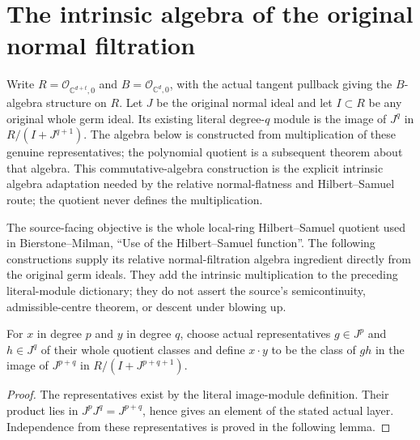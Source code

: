 \section{The intrinsic algebra of the original normal filtration}

Write $R=\mathcal O_{\mathbb C^{d+t},0}$ and
$B=\mathcal O_{\mathbb C^d,0}$, with the actual tangent pullback giving
the $B$-algebra structure on $R$. Let $J$ be the original normal ideal and
let $I\subset R$ be any original whole germ ideal. Its existing literal
degree-$q$ module is the image of $J^q$ in $R/(I+J^{q+1})$. The algebra
below is constructed from multiplication of these genuine representatives;
the polynomial quotient is a subsequent theorem about that algebra. This
commutative-algebra construction is the explicit intrinsic algebra adaptation
needed by the relative normal-flatness and Hilbert--Samuel route; the quotient
never defines the multiplication.

The source-facing objective is the whole local-ring Hilbert--Samuel
quotient used in Bierstone--Milman, ``Use of the Hilbert--Samuel function''.
The following constructions supply its relative normal-filtration algebra
ingredient directly from the original germ ideals. They add the intrinsic
multiplication to the preceding literal-module dictionary; they do not assert
the source's semicontinuity, admissible-centre theorem, or descent under
blowing up.

\begin{definition}
\label{hir:relative-normal-intrinsic-layer-multiplication}
\leanok
{}
For $x$ in degree $p$ and $y$ in degree $q$, choose actual representatives
$g\in J^p$ and $h\in J^q$ of their whole quotient classes and define
$x\cdot y$ to be the class of $gh$ in the image of $J^{p+q}$ in
$R/(I+J^{p+q+1})$.
\end{definition}
\begin{proof}
The representatives exist by the literal image-module definition.
Their product lies in $J^pJ^q=J^{p+q}$, hence gives an element of the
stated actual layer. Independence from these representatives is proved in
the following lemma.
\end{proof}

